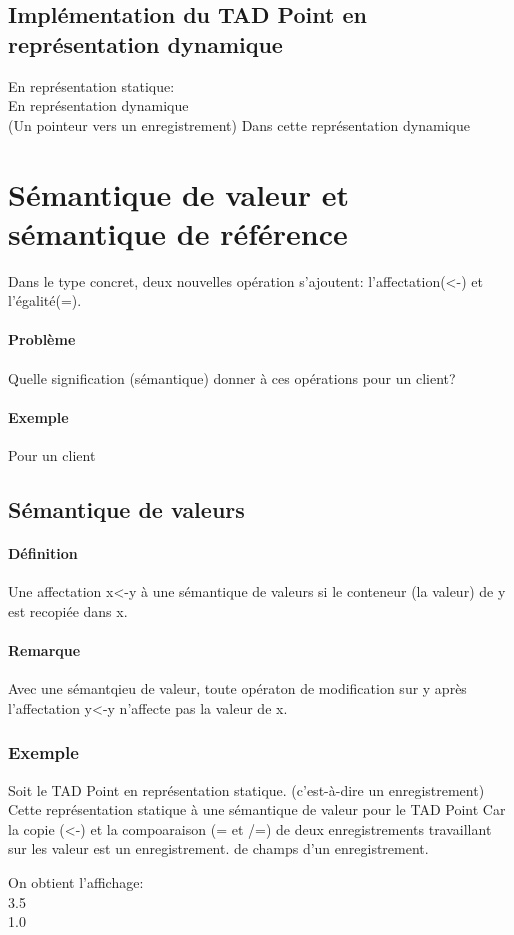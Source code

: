 	\subsection{Implémentation du TAD Point en représentation dynamique}
		En représentation statique: \\
			
		En représentation dynamique \\
			
		(Un pointeur vers un enregistrement)
		Dans cette représentation dynamique		
		


\section{Sémantique de valeur et sémantique de référence}
	Dans le type concret, deux nouvelles opération s'ajoutent: l'affectation(<-) et l'égalité(=).
	\paragraph{Problème} Quelle signification (sémantique) donner à ces opérations pour un client? 
	\paragraph{Exemple} Pour un client
		

	\subsection{Sémantique de valeurs}
		\paragraph{Définition}
			Une affectation x<-y à une sémantique de valeurs si le conteneur (la valeur) de y est 
				recopiée dans x.
		\paragraph{Remarque}
			Avec une sémantqieu de valeur, toute opératon de modification sur y après l'affectation y<-y
			n'affecte pas la valeur de x.
		\subsubsection{Exemple}
			Soit le TAD Point en représentation statique. (c'est-à-dire un enregistrement)\\
			Cette représentation statique à une sémantique de valeur pour le TAD Point
			Car la copie (<-) et la compoaraison (= et /=) de deux enregistrements travaillant sur les
			valeur est un enregistrement.
			de champs d'un enregistrement. 
			
			
			
			
			On obtient l'affichage: \\
			3.5\\1.0

